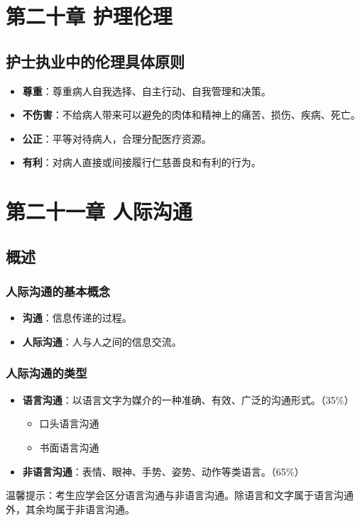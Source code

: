 \documentclass[11pt, a4paper]{ctexart}
\newcommand{\ocrimage}[1]{\texttt{#1}}
\begin{document}
\section{第二十章 护理伦理}
\subsection{护士执业中的伦理具体原则}
\begin{itemize}
	\item \textbf{尊重}：尊重病人自我选择、自主行动、自我管理和决策。
	\item \textbf{不伤害}：不给病人带来可以避免的肉体和精神上的痛苦、损伤、疾病、死亡。
	\item \textbf{公正}：平等对待病人，合理分配医疗资源。
	\item \textbf{有利}：对病人直接或间接履行仁慈善良和有利的行为。
\end{itemize}

\section{第二十一章 人际沟通}
\subsection{概述}
\subsubsection{人际沟通的基本概念}
\begin{itemize}
	\item \textbf{沟通}：信息传递的过程。
	\item \textbf{人际沟通}：人与人之间的信息交流。
\end{itemize}

\subsubsection{人际沟通的类型}
\begin{itemize}
	\item \textbf{语言沟通}：以语言文字为媒介的一种准确、有效、广泛的沟通形式。（35\%）
	      \begin{itemize}
		      \item 口头语言沟通
		      \item 书面语言沟通
	      \end{itemize}
	\item \textbf{非语言沟通}：表情、眼神、手势、姿势、动作等类语言。（65\%）
\end{itemize}
温馨提示：考生应学会区分语言沟通与非语言沟通。除语言和文字属于语言沟通外，其余均属于非语言沟通。
\end{document}

